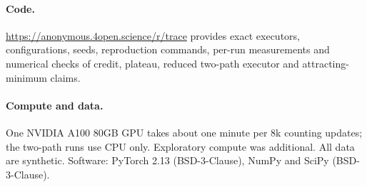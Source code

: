 \paragraph{Code.} \url{https://anonymous.4open.science/r/trace} provides exact executors,
configurations, seeds, reproduction commands, per-run measurements and numerical checks
of credit, plateau, reduced two-path executor and attracting-minimum claims.

\paragraph{Compute and data.} One NVIDIA A100 80GB GPU takes about one minute per $8$k
counting updates; the two-path runs use CPU only. Exploratory compute was additional. All data are synthetic.
Software: PyTorch 2.13 (BSD-3-Clause), NumPy and SciPy (BSD-3-Clause).
